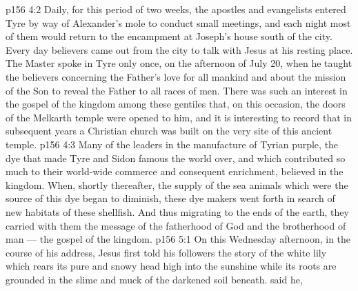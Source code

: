 \vs p156 4:2 Daily, for this period of two weeks, the apostles and evangelists entered Tyre by way of Alexander’s mole to conduct small meetings, and each night most of them would return to the encampment at Joseph’s house south of the city. Every day believers came out from the city to talk with Jesus at his resting place. The Master spoke in Tyre only once, on the afternoon of July 20, when he taught the believers concerning the Father’s love for all mankind and about the mission of the Son to reveal the Father to all races of men. There was such an interest in the gospel of the kingdom among these gentiles that, on this occasion, the doors of the Melkarth temple were opened to him, and it is interesting to record that in subsequent years a Christian church was built on the very site of this ancient temple.
\vs p156 4:3 Many of the leaders in the manufacture of Tyrian purple, the dye that made Tyre and Sidon famous the world over, and which contributed so much to their world\hyp{}wide commerce and consequent enrichment, believed in the kingdom. When, shortly thereafter, the supply of the sea animals which were the source of this dye began to diminish, these dye makers went forth in search of new habitats of these shellfish. And thus migrating to the ends of the earth, they carried with them the message of the fatherhood of God and the brotherhood of man --- the gospel of the kingdom.
\vs p156 5:1 On this Wednesday afternoon, in the course of his address, Jesus first told his followers the story of the white lily which rears its pure and snowy head high into the sunshine while its roots are grounded in the slime and muck of the darkened soil beneath.  said he, 
